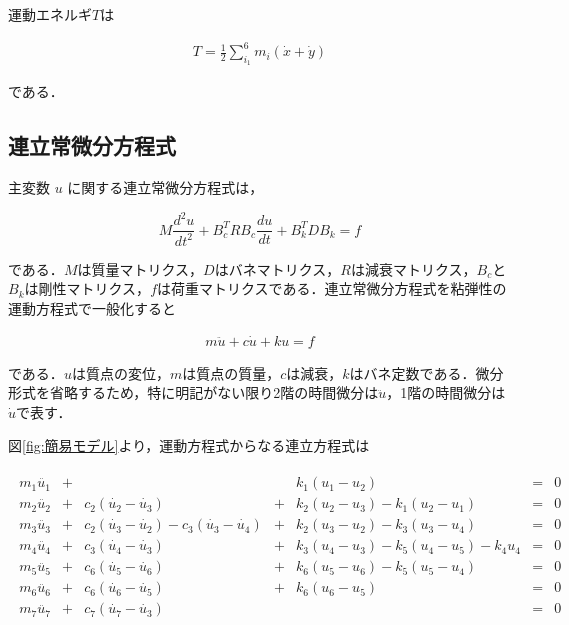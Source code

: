 運動エネルギ$T$は

\begin{eqnarray}
    T = \frac{1}{2} \sum^6_{i_1} m_i(\dot{x} + \dot{y})
\end{eqnarray}

である．



\subsection{連立常微分方程式}

主変数 $u$ に関する連立常微分方程式は，

\begin{equation}
    M \frac{d^2 u}{dt^2} + B_c^T R B_c \frac{du}{dt} + B_k^T D B_k = f    
\end{equation}

である．$M$は質量マトリクス，$D$はバネマトリクス，$R$は減衰マトリクス，$B_c$と$B_k$は剛性マトリクス，$f$は荷重マトリクスである．連立常微分方程式を粘弾性の運動方程式で一般化すると

\begin{eqnarray}
    m\ddot{u} + c\dot{u} + ku = f
\end{eqnarray}

である．$u$は質点の変位，$m$は質点の質量，$c$は減衰，$k$はバネ定数である．微分形式を省略するため，特に明記がない限り2階の時間微分は$\ddot{u}$，1階の時間微分は$\dot{u}$で表す．

図\ref{fig:簡易モデル}より，運動方程式からなる連立方程式は

\begin{eqnarray}
    \begin{matrix}
        m_1 \ddot{u_1} &+&  & & k_1 (u_1 - u_2) &=& 0 \\ 
        m_2 \ddot{u_2} &+& c_2(\dot{u_2} - \dot{u_3}) &+& k_2 (u_2 - u_3) - k_1 (u_2 - u_1) &=& 0 \\ 
        m_3 \ddot{u_3} &+& c_2(\dot{u_3} - \dot{u_2}) - c_3(\dot{u_3} - \dot{u_4}) &+& k_2 (u_3 - u_2) - k_3 (u_3 - u_4) &=& 0 \\ 
        m_4 \ddot{u_4} &+& c_3(\dot{u_4} - \dot{u_3}) &+& k_3 (u_4 - u_3) - k_5 (u_4 - u_5) - k_4 u_4 &=& 0 \\ 
        m_5 \ddot{u_5} &+& c_6(\dot{u_5} - \dot{u_6}) &+& k_6 (u_5 - u_6) - k_5 (u_5 - u_4) &=& 0 \\
        m_6 \ddot{u_6} &+& c_6(\dot{u_6} - \dot{u_5}) &+& k_6 (u_6 - u_5) &=& 0 \\
        m_7 \ddot{u_7} &+& c_7(\dot{u_7} - \dot{u_3}) & & &=& 0
    \end{matrix}        
\end{eqnarray}

